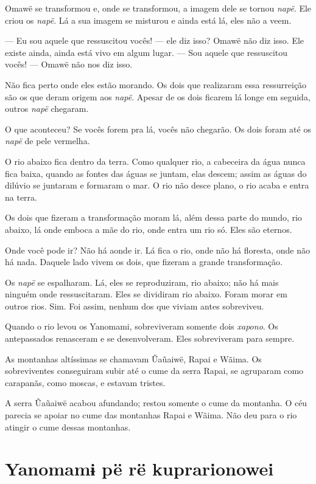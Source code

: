 Omawë se transformou e, onde se transformou, a imagem dele se
tornou \textit{napë}. Ele criou os \textit{napë}. Lá a sua imagem se misturou
e ainda está lá, eles não a veem. 

--- Eu sou aquele que ressuscitou vocês! --- ele diz isso? Omawë não diz
 isso. Ele existe ainda, ainda está vivo em algum lugar. --- Sou aquele que
 ressuscitou vocês! --- Omawë não nos diz isso. 

Não fica perto onde eles estão morando. Os dois que realizaram essa
 ressurreição são os que deram origem aos \textit{napë}. Apesar de os dois
 ficarem lá longe em seguida, outros \textit{napë} chegaram. 

O que aconteceu? Se vocês forem pra lá, vocês não chegarão. Os dois
foram até os \textit{napë} de pele vermelha. 

O rio abaixo fica dentro da terra. Como qualquer rio, a cabeceira da
 água nunca fica baixa, quando as fontes das águas se juntam, elas
 descem; assim as águas do dilúvio se juntaram e formaram o mar. O rio
 não desce plano, o rio acaba e entra na terra. 

Os dois que fizeram a transformação moram lá, além dessa parte do mundo,
rio abaixo, lá onde emboca a mãe do rio, onde entra um rio só. Eles são
eternos. 

Onde você pode ir? Não há aonde ir. Lá fica o rio, onde não há floresta,
onde não há nada. Daquele lado vivem os dois, que fizeram a grande
transformação. 

Os \textit{napë} se espalharam. Lá, eles se reproduziram, rio abaixo; não
há mais ninguém onde ressuscitaram. Eles se dividiram rio abaixo. Foram
morar em outros rios. Sim. Foi assim, nenhum dos que viviam
antes sobreviveu. 

Quando o rio levou os Yanomami, sobreviveram somente dois \textit{xapono}. Os
antepassados renasceram e se desenvolveram. Eles sobreviveram para
sempre. 

As montanhas altíssimas se chamavam Ũaũaiwë, Rapai e Wãima. Os
 sobreviventes conseguiram subir até o cume da serra Rapai, se agruparam
 como carapanãs, como moscas, e estavam tristes.

A serra Ũaũaiwë acabou afundando; restou somente o cume da montanha. O céu parecia se apoiar no cume das montanhas Rapai e Wãima. Não deu para
 o rio atingir o cume dessas montanhas. 

\chapter*{Yanomamɨ pë rë kuprarionowei\smallskip{}}

